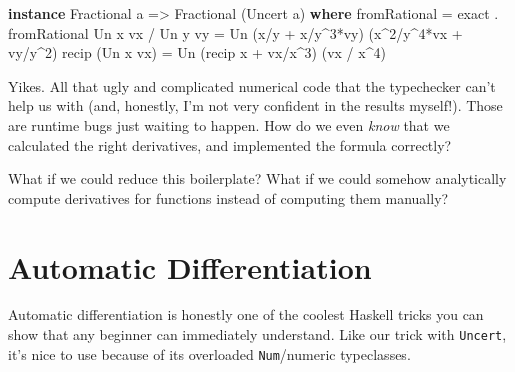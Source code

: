 \documentclass[]{article}
\newenvironment{Shaded}{}{}
\newcommand{\KeywordTok}[1]{\textcolor[rgb]{0.00,0.44,0.13}{\textbf{#1}}}
\newcommand{\DataTypeTok}[1]{\textcolor[rgb]{0.56,0.13,0.00}{#1}}
\newcommand{\DecValTok}[1]{\textcolor[rgb]{0.25,0.63,0.44}{#1}}
\newcommand{\OtherTok}[1]{\textcolor[rgb]{0.00,0.44,0.13}{#1}}
\newcommand{\FunctionTok}[1]{\textcolor[rgb]{0.02,0.16,0.49}{#1}}
\newcommand{\NormalTok}[1]{#1}
\begin{document}
\begin{Shaded}
\begin{Highlighting}[]
\KeywordTok{instance} \DataTypeTok{Fractional}\NormalTok{ a }\OtherTok{=>} \DataTypeTok{Fractional}\NormalTok{ (}\DataTypeTok{Uncert}\NormalTok{ a) }\KeywordTok{where}
\NormalTok{    fromRational      }\FunctionTok{=}\NormalTok{ exact }\FunctionTok{.}\NormalTok{ fromRational}
    \DataTypeTok{Un}\NormalTok{ x vx }\FunctionTok{/} \DataTypeTok{Un}\NormalTok{ y vy }\FunctionTok{=} \DataTypeTok{Un}\NormalTok{ (x}\FunctionTok{/}\NormalTok{y }\FunctionTok{+}\NormalTok{ x}\FunctionTok{/}\NormalTok{y}\FunctionTok{^}\DecValTok{3}\FunctionTok{*}\NormalTok{vy)   (x}\FunctionTok{^}\DecValTok{2}\FunctionTok{/}\NormalTok{y}\FunctionTok{^}\DecValTok{4}\FunctionTok{*}\NormalTok{vx }\FunctionTok{+}\NormalTok{ vy}\FunctionTok{/}\NormalTok{y}\FunctionTok{^}\DecValTok{2}\NormalTok{)}
\NormalTok{    recip (}\DataTypeTok{Un}\NormalTok{ x vx)   }\FunctionTok{=} \DataTypeTok{Un}\NormalTok{ (recip x }\FunctionTok{+}\NormalTok{ vx}\FunctionTok{/}\NormalTok{x}\FunctionTok{^}\DecValTok{3}\NormalTok{) (vx }\FunctionTok{/}\NormalTok{ x}\FunctionTok{^}\DecValTok{4}\NormalTok{)}
\end{Highlighting}
\end{Shaded}

Yikes. All that ugly and complicated numerical code that the typechecker can't
help us with (and, honestly, I'm not very confident in the results myself!).
Those are runtime bugs just waiting to happen. How do we even \emph{know} that
we calculated the right derivatives, and implemented the formula correctly?

What if we could reduce this boilerplate? What if we could somehow analytically
compute derivatives for functions instead of computing them manually?

\section{Automatic Differentiation}\label{automatic-differentiation}

Automatic differentiation is honestly one of the coolest Haskell tricks you can
show that any beginner can immediately understand. Like our trick with
\texttt{Uncert}, it's nice to use because of its overloaded \texttt{Num}/numeric
typeclasses.
\end{document}
